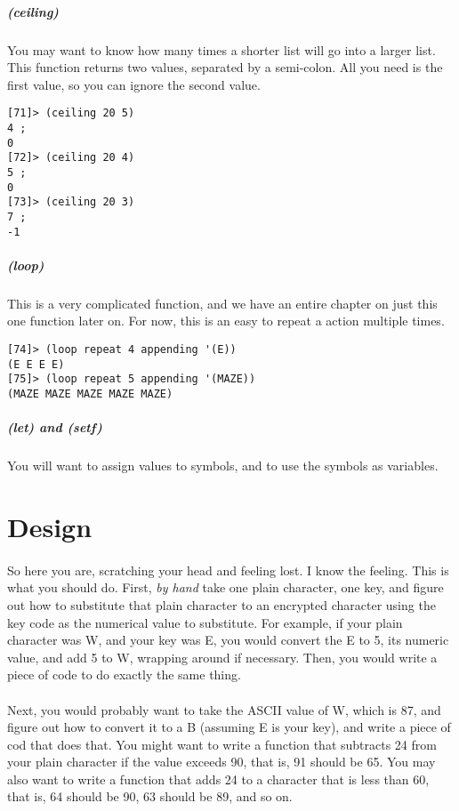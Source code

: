 \documentclass{article}
\begin{document}
\subparagraph{(ceiling)}You may want to know how many times a shorter list will go into a larger list. This function returns two values, separated by a semi-colon. All you need is the first value, so you can ignore the second value.
\begin{verbatim}
[71]> (ceiling 20 5)
4 ;
0
[72]> (ceiling 20 4)
5 ;
0
[73]> (ceiling 20 3)
7 ;
-1
\end{verbatim}

\subparagraph{(loop)}This is a very complicated function, and we have an entire chapter on just this one function later on. For now, this is an easy to repeat a action multiple times.
\begin{verbatim}
[74]> (loop repeat 4 appending '(E))
(E E E E)
[75]> (loop repeat 5 appending '(MAZE))
(MAZE MAZE MAZE MAZE MAZE)
\end{verbatim}

%
%


\subparagraph{(let) and (setf)}You will want to assign values to symbols, and to use the symbols as variables.

\section{Design}

\paragraph{}So here you are, scratching your head and feeling lost. I know the feeling. This is what you should do. First, \textit{by hand} take one plain character, one key, and figure out how to substitute that plain character to an encrypted character using the key code as the numerical value to substitute. For example, if your plain character was W, and your key was E, you would convert the E to 5, its numeric value, and add 5 to W, wrapping around if necessary. Then, you would write a piece of code to do exactly the same thing.

\paragraph{}Next, you would probably want to take the ASCII value of W, which is 87, and figure out how to convert it to a B (assuming E is your key), and write a piece of cod that does that. You might want to write a function that subtracts 24 from your plain character if the value exceeds 90, that is, 91 should be 65. You may also want to write a function that adds 24 to a character that is less than 60, that is, 64 should be 90, 63 should be 89, and so on.
\end{document}
